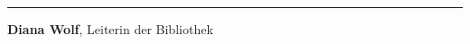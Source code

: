 \begin{center}\rule{0.5\linewidth}{\linethickness}\end{center}

\textbf{Diana Wolf}, Leiterin der Bibliothek
